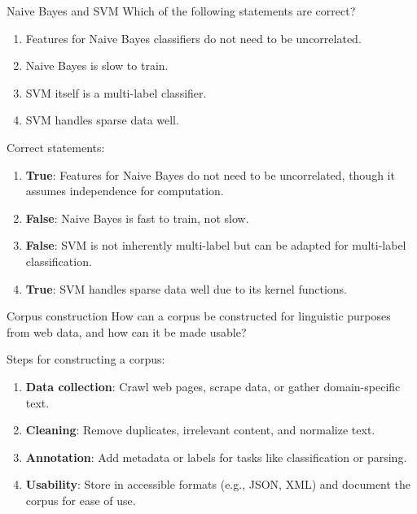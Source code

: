 \documentclass{article}
\begin{document}
\begin{exercise}{Naive Bayes and SVM}
  Which of the following statements are correct?
  \begin{enumerate}
    \item Features for Naive Bayes classifiers do not need to be uncorrelated.
    \item Naive Bayes is slow to train.
    \item SVM itself is a multi-label classifier.
    \item SVM handles sparse data well.
  \end{enumerate}

  \begin{solution}
    Correct statements:
    \begin{enumerate}
        \item \textbf{True}: Features for Naive Bayes do not need to be uncorrelated, though it assumes independence for computation.
        \item \textbf{False}: Naive Bayes is fast to train, not slow.
        \item \textbf{False}: SVM is not inherently multi-label but can be adapted for multi-label classification.
        \item \textbf{True}: SVM handles sparse data well due to its kernel functions.
    \end{enumerate}
  \end{solution}
\end{exercise}

\begin{exercise}{Corpus construction}
  How can a corpus be constructed for linguistic purposes from web data, and how can it be made usable?

  \begin{solution}
    Steps for constructing a corpus:
    \begin{enumerate}
        \item \textbf{Data collection}: Crawl web pages, scrape data, or gather domain-specific text.
        \item \textbf{Cleaning}: Remove duplicates, irrelevant content, and normalize text.
        \item \textbf{Annotation}: Add metadata or labels for tasks like classification or parsing.
        \item \textbf{Usability}: Store in accessible formats (e.g., JSON, XML) and document the corpus for ease of use.
    \end{enumerate}
  \end{solution}
\end{exercise}
\end{document}

